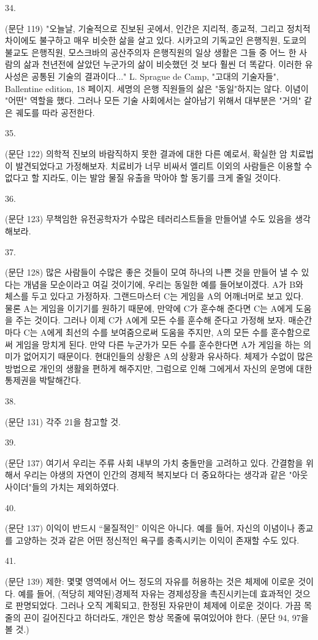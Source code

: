 \documentclass[11pt,a4paper]{article}
\begin{document}
\begin{multicols}{2}
\hypertarget{34}{34.} (문단 119) "오늘날, 기술적으로 진보된 곳에서, 인간은 지리적, 종교적, 그리고 정치적 차이에도  불구하고 매우 비슷한 삶을 살고 있다. 시카고의 기독교인 은행직원, 도쿄의 불교도 은행직원, 모스크바의 공산주의자 은행직원의 일상 생활은 그들 중 어느 한 사람의 삶과 천년전에 살았던 누군가의 삶이  비슷했던 것 보다 훨씬 더 똑같다. 이러한 유사성은 공통된 기술의 결과이다..." L. Sprague de Camp,  "고대의 기술자들", Ballentine edition, 18 페이지. 세명의 은행 직원들의 삶은 "동일"하지는 않다.  이념이 "어떤" 역할을 했다. 그러나 모든 기술 사회에서는 살아남기 위해서 대부분은 "거의" 같은 궤도를  따라 공전한다.  


\hypertarget{35}{35.} (문단 122) 의학적 진보의 바람직하지 못한 결과에 대한 다른 예로서, 확실한 암 치료법이 발견되었다고 가정해보자. 치료비가 너무 비싸서 엘리트 이외의 사람들은 이용할 수 없다고 할 지라도, 이는 발암 물질 유출을 막아야 할 동기를 크게 줄일 것이다.  


\hypertarget{36}{36.} (문단 123) 무책임한 유전공학자가 수많은 테러리스트들을 만들어낼 수도 있음을 생각해보라. 


\hypertarget{37}{37.} (문단 128) 많은 사람들이 수많은 좋은 것들이 모여 하나의 나쁜 것을 만들어 낼 수 있다는 개념을  모순이라고 여길 것이기에, 우리는 동일한 예를 들어보이겠다. A가 B와 체스를 두고 있다고 가정하자.  그랜드마스터 C는 게임을 A의 어깨너머로 보고 있다. 물론 A는 게임을 이기기를 원하기 때문에, 만약에  C가 훈수해 준다면 C는 A에게 도움을 주는 것이다. 그러나 이제 C가 A에게 모든 수를 훈수해 준다고  가정해 보자. 매순간마다 C는 A에게 최선의 수를 보여줌으로써 도움을 주지만, A의 모든 수를  훈수함으로써 게임을 망치게 된다. 만약 다른 누군가가 모든 수를 훈수한다면 A가 게임을 하는 의미가  없어지기 때문이다. 현대인들의 상황은 A의 상황과 유사하다. 체제가 수없이 많은 방법으로 개인의  생활을 편하게 해주지만, 그럼으로 인해 그에게서 자신의 운명에 대한 통제권을 박탈해간다. 


\hypertarget{38}{38.} (문단 131) 각주 21을 참고할 것. 


\hypertarget{39}{39.} (문단 137) 여기서 우리는 주류 사회 내부의 가치 충돌만을 고려하고 있다. 간결함을 위해서 우리는  야생의 자연이 인간의 경제적 복지보다 더 중요하다는 생각과 같은 "아웃사이더"들의 가치는 제외하였다. 


\hypertarget{40}{40.} (문단 137) 이익이 반드시 “물질적인” 이익은 아니다. 예를 들어, 자신의 이념이나 종교를 고양하는  것과 같은 어떤 정신적인 욕구를 충족시키는 이익이 존재할 수도 있다.  


\hypertarget{41}{41.} (문단 139) 제한: 몇몇 영역에서 어느 정도의 자유를 허용하는 것은 체제에 이로운 것이다. 예를  들어, (적당히 제약된)경제적 자유는 경제성장을 촉진시키는데 효과적인 것으로 판명되었다. 그러나 오직 계획되고, 한정된 자유만이 체제에 이로운 것이다. 가끔 목줄의 끈이 길어진다고 하더라도, 개인은 항상  목줄에 묶여있어야 한다. (문단 94, 97을 볼 것.) 



\end{multicols}
\end{document}

